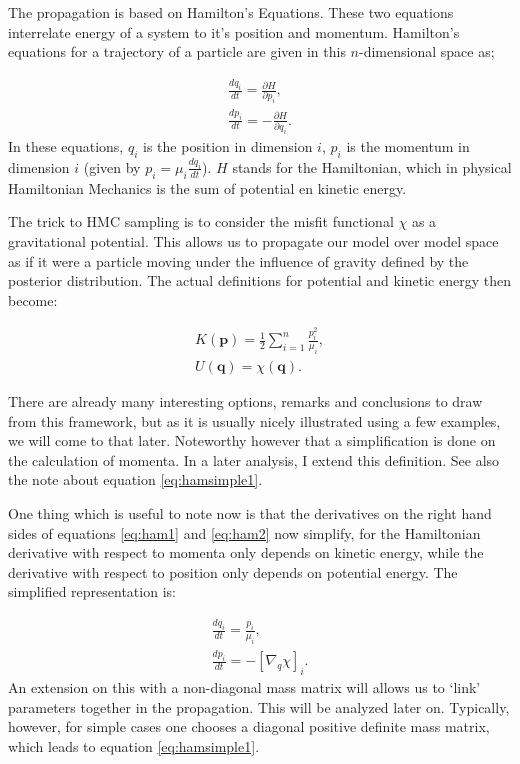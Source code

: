 The propagation is based on Hamilton's Equations. These two equations interrelate energy of a system to it's position and momentum. Hamilton's equations for a trajectory of a particle are given in this $n$-dimensional space as;

\begin{gather}
	\frac{d q_i}{dt} = \frac{\partial H}{\partial p_i},\label{eq:ham1}\\
	\frac{d p_i}{dt} = - \frac{\partial H}{\partial q_i}\label{eq:ham2}.
\end{gather}
In these equations, $q_i$ is the position in dimension $i$, $p_i$ is the momentum in dimension $i$ (given by $p_i = \mu_i \frac{d q_i}{dt}$). $H$ stands for the Hamiltonian, which in physical Hamiltonian Mechanics is the sum of potential en kinetic energy.

The trick to \gls{HMC} sampling is to consider the misfit functional $\chi$ as a gravitational potential. This allows us to propagate our model over model space as if it were a particle moving under the influence of gravity defined by the posterior distribution. The actual definitions for potential and kinetic energy then become:

\begin{gather}
	K(\mathbf{p}) = \frac{1}{2} \sum_{i=1}^{n} \frac{p_i^2}{\mu_i},\\
	U(\mathbf{q}) = \chi(\mathbf{q}).
\end{gather}

There are already many interesting options, remarks and conclusions to draw from this framework, but as it is usually nicely illustrated using a few examples, we will come to that later. Noteworthy however that a simplification is done on the calculation of momenta. In a later analysis, I extend this definition. See also the note about equation \eqref{eq:hamsimple1}.

One thing which is useful to note now is that the derivatives on the right hand sides of equations \eqref{eq:ham1} and \eqref{eq:ham2} now simplify, for the Hamiltonian derivative with respect to momenta only depends on kinetic energy, while the derivative with respect to position only depends on potential energy. The simplified representation is:

\begin{gather}
\frac{d q_i}{dt} = \frac{p_i}{\mu_i},\label{eq:hamsimple1}\\
\frac{d p_i}{dt} = - \left[\nabla_{q} \chi \right]_i\label{eq:hamsimple2}.
\end{gather}
An extension on this with a non-diagonal mass matrix will allows us to `link' parameters together in the propagation. This will be analyzed later on. Typically, however, for simple cases one chooses a diagonal positive definite mass matrix, which leads to equation \eqref{eq:hamsimple1}.

